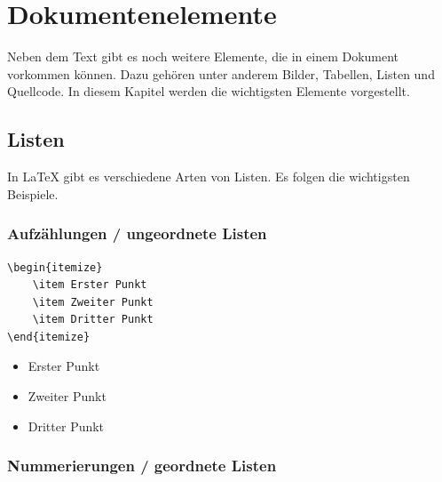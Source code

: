\section{Dokumentenelemente}
Neben dem Text gibt es noch weitere Elemente, die in einem Dokument vorkommen können. Dazu gehören unter anderem Bilder, Tabellen, Listen und Quellcode. In diesem Kapitel werden die wichtigsten Elemente vorgestellt.

\subsection{Listen}
In \LaTeX{} gibt es verschiedene Arten von Listen. Es folgen die wichtigsten Beispiele.

\subsubsection{Aufzählungen / ungeordnete Listen}

\begin{minipage}{0.58\textwidth}
    \begin{lstlisting}[language={[LaTeX]TeX}]
\begin{itemize}
    \item Erster Punkt
    \item Zweiter Punkt
    \item Dritter Punkt
\end{itemize}
\end{lstlisting}
\end{minipage}
\hfill
\begin{minipage}{0.35\textwidth}
    \begin{itemize}
        \item Erster Punkt
        \item Zweiter Punkt
        \item Dritter Punkt
    \end{itemize}
\end{minipage}

\subsubsection{Nummerierungen / geordnete Listen}

